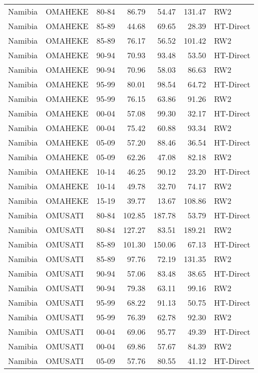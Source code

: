 \begin{longtable}{lllrrrl}
  Namibia & OMAHEKE & 80-84 & 86.79 & 54.47 & 131.47 & RW2 \\ 
  Namibia & OMAHEKE & 85-89 & 44.68 & 69.65 & 28.39 & HT-Direct \\ 
  Namibia & OMAHEKE & 85-89 & 76.17 & 56.52 & 101.42 & RW2 \\ 
  Namibia & OMAHEKE & 90-94 & 70.93 & 93.48 & 53.50 & HT-Direct \\ 
  Namibia & OMAHEKE & 90-94 & 70.96 & 58.03 & 86.63 & RW2 \\ 
  Namibia & OMAHEKE & 95-99 & 80.01 & 98.54 & 64.72 & HT-Direct \\ 
  Namibia & OMAHEKE & 95-99 & 76.15 & 63.86 & 91.26 & RW2 \\ 
  Namibia & OMAHEKE & 00-04 & 57.08 & 99.30 & 32.17 & HT-Direct \\ 
  Namibia & OMAHEKE & 00-04 & 75.42 & 60.88 & 93.34 & RW2 \\ 
  Namibia & OMAHEKE & 05-09 & 57.20 & 88.46 & 36.54 & HT-Direct \\ 
  Namibia & OMAHEKE & 05-09 & 62.26 & 47.08 & 82.18 & RW2 \\ 
  Namibia & OMAHEKE & 10-14 & 46.25 & 90.12 & 23.20 & HT-Direct \\ 
  Namibia & OMAHEKE & 10-14 & 49.78 & 32.70 & 74.17 & RW2 \\ 
  Namibia & OMAHEKE & 15-19 & 39.77 & 13.67 & 108.86 & RW2 \\ 
  Namibia & OMUSATI & 80-84 & 102.85 & 187.78 & 53.79 & HT-Direct \\ 
  Namibia & OMUSATI & 80-84 & 127.27 & 83.51 & 189.21 & RW2 \\ 
  Namibia & OMUSATI & 85-89 & 101.30 & 150.06 & 67.13 & HT-Direct \\ 
  Namibia & OMUSATI & 85-89 & 97.76 & 72.19 & 131.35 & RW2 \\ 
  Namibia & OMUSATI & 90-94 & 57.06 & 83.48 & 38.65 & HT-Direct \\ 
  Namibia & OMUSATI & 90-94 & 79.38 & 63.11 & 99.16 & RW2 \\ 
  Namibia & OMUSATI & 95-99 & 68.22 & 91.13 & 50.75 & HT-Direct \\ 
  Namibia & OMUSATI & 95-99 & 76.39 & 62.78 & 92.30 & RW2 \\ 
  Namibia & OMUSATI & 00-04 & 69.06 & 95.77 & 49.39 & HT-Direct \\ 
  Namibia & OMUSATI & 00-04 & 69.86 & 57.67 & 84.39 & RW2 \\ 
  Namibia & OMUSATI & 05-09 & 57.76 & 80.55 & 41.12 & HT-Direct \\ 

\end{longtable}
